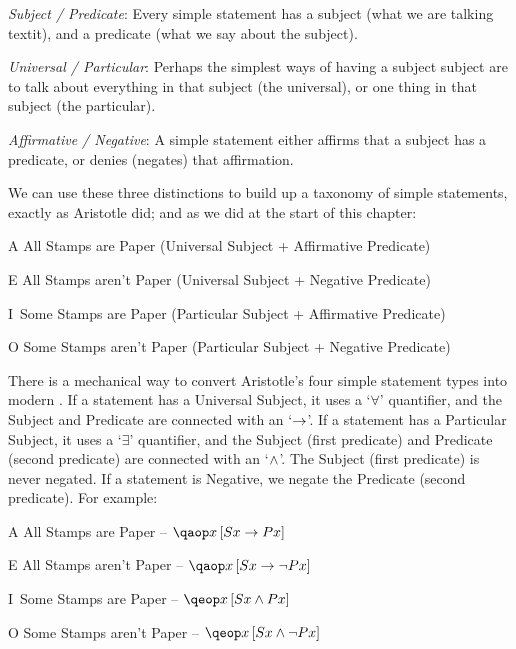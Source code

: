 \documentclass[PHIL101-Textbook.tex]{subfiles}
\begin{document}
\begin{earg}
\item \textit{Subject / Predicate}: Every simple statement has a subject (what we are talking textit), and a predicate (what we say about the subject).
\item \textit{Universal / Particular}: Perhaps the simplest ways of having a subject  subject are to talk about everything in that subject (the universal), or one thing in that subject (the particular). 
\item \textit{Affirmative / Negative}: A simple statement either affirms that a subject has a predicate, or denies (negates) that affirmation.
\end{earg}
We can use these three distinctions to build up a taxonomy of simple statements, exactly as Aristotle did; and as we did at the start of this chapter:
\begin{earg}
\item[A] All Stamps are Paper (Universal Subject + Affirmative Predicate)
\item[E] All Stamps aren't Paper (Universal Subject + Negative Predicate)%
\item[I\,] Some Stamps are Paper (Particular Subject + Affirmative Predicate)
\item[O] Some Stamps aren't Paper (Particular Subject + Negative Predicate)
\end{earg}


There is a mechanical way to convert Aristotle's four simple statement types into modern \pl. 
If a statement has a Universal Subject, it uses a `$\forall$' quantifier, and the Subject and Predicate are connected with an `$\rightarrow$'.
If a statement has a Particular Subject, it uses a `$\exists$' quantifier, and the Subject (first predicate) and Predicate (second predicate) are connected with an `$\land$'.
The Subject (first predicate) is never negated. If a statement is Negative, we negate the Predicate (second predicate). For example:

\begin{earg}
\item[A] All Stamps are Paper -- $\qab{x}{Sx \eif Px}$
\item[E] All Stamps aren't Paper -- $\qab{x}{Sx \eif \enot Px}$
\item[I\,] Some Stamps are Paper -- $\qeb{x}{Sx \eand Px}$
\item[O] Some Stamps aren't Paper -- $\qeb{x}{Sx \eand \enot Px}$
\end{earg}
\end{document}
